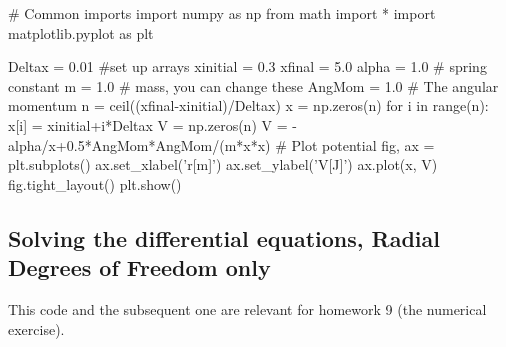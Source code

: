 \documentclass[%
oneside,                 %
final,                   %
10pt]{article}
\begin{document}
\bpycod
# Common imports
import numpy as np
from math import *
import matplotlib.pyplot as plt

Deltax = 0.01
#set up arrays
xinitial = 0.3
xfinal = 5.0
alpha = 1.0   # spring constant
m = 1.0   # mass, you can change these
AngMom = 1.0  #  The angular momentum
n = ceil((xfinal-xinitial)/Deltax)
x = np.zeros(n)
for i in range(n):
    x[i] = xinitial+i*Deltax
V = np.zeros(n)
V = -alpha/x+0.5*AngMom*AngMom/(m*x*x)
# Plot potential
fig, ax = plt.subplots()
ax.set_xlabel('r[m]')
ax.set_ylabel('V[J]')
ax.plot(x, V)
fig.tight_layout()
plt.show()


\epycod


\subsection{Solving the differential equations, Radial Degrees of Freedom only}

This code and the subsequent one are relevant for homework 9 (the numerical exercise).
\end{document}
